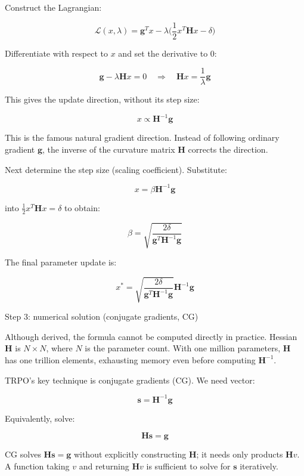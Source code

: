 Construct the Lagrangian:

\[
\mathcal{L}(x,\lambda)=
\mathbf{g}^{T}x
-\lambda
\bigl(
\frac{1}{2}x^{T}\mathbf{H}x-\delta
\bigr)
\]

Differentiate with respect to \(x\) and set the derivative to \(0\):

\[
\mathbf{g}-\lambda\mathbf{H}x=0
\quad\Longrightarrow\quad
\mathbf{H}x=\frac{1}{\lambda}\mathbf{g}
\]

This gives the update direction, without its step size:

\[
x\propto\mathbf{H}^{-1}\mathbf{g}
\]

This is the famous natural gradient direction. Instead of following ordinary gradient \(\mathbf{g}\), the inverse of the curvature matrix \(\mathbf{H}\) corrects the direction.

Next determine the step size (scaling coefficient). Substitute:

\[
x=\beta\mathbf{H}^{-1}\mathbf{g}
\]

into \(\frac{1}{2}x^{T}\mathbf{H}x=\delta\) to obtain:

\[
\beta=
\sqrt{
\frac{2\delta}{\mathbf{g}^{T}\mathbf{H}^{-1}\mathbf{g}}
}
\]

The final parameter update is:

\[
x^{*}
=
\sqrt{
\frac{2\delta}{\mathbf{g}^{T}\mathbf{H}^{-1}\mathbf{g}}
}
\mathbf{H}^{-1}\mathbf{g}
\]

Step 3: numerical solution (conjugate gradients, CG)

Although derived, the formula cannot be computed directly in practice. Hessian \(\mathbf{H}\) is \(N\times N\), where \(N\) is the parameter count. With one million parameters, \(\mathbf{H}\) has one trillion elements, exhausting memory even before computing \(\mathbf{H}^{-1}\).

TRPO's key technique is conjugate gradients (CG). We need vector:

\[
\mathbf{s}=\mathbf{H}^{-1}\mathbf{g}
\]

Equivalently, solve:

\[
\mathbf{H}\mathbf{s}=\mathbf{g}
\]

CG solves \(\mathbf{H}\mathbf{s}=\mathbf{g}\) without explicitly constructing \(\mathbf{H}\); it needs only products \(\mathbf{H}v\). A function taking \(v\) and returning \(\mathbf{H}v\) is sufficient to solve for \(\mathbf{s}\) iteratively.

